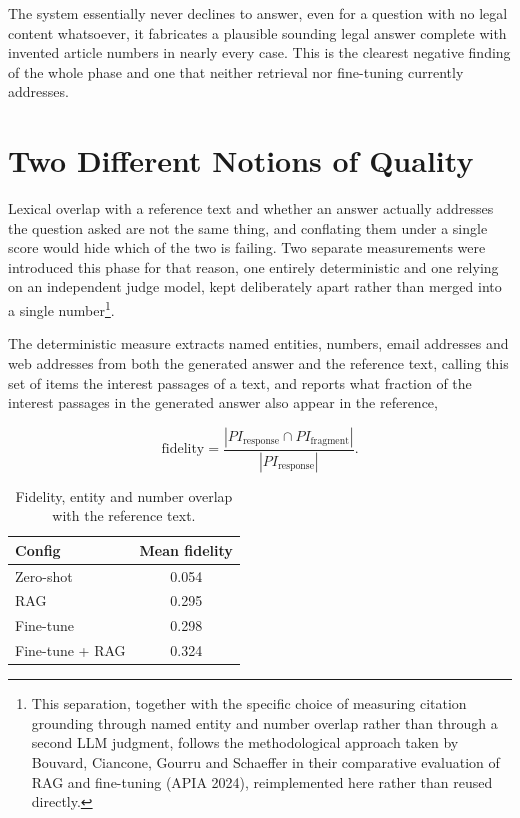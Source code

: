 \documentclass[11pt, a4paper]{article}
\begin{document}
The system essentially never declines to answer, even for a question with no legal content whatsoever, it fabricates a plausible sounding legal answer complete with invented article numbers in nearly every case. This is the clearest negative finding of the whole phase and one that neither retrieval nor fine-tuning currently addresses.

\section{Two Different Notions of Quality}
\label{sec:judge}

Lexical overlap with a reference text and whether an answer actually addresses the question asked are not the same thing, and conflating them under a single score would hide which of the two is failing. Two separate measurements were introduced this phase for that reason, one entirely deterministic and one relying on an independent judge model, kept deliberately apart rather than merged into a single number\footnote{This separation, together with the specific choice of measuring citation grounding through named entity and number overlap rather than through a second LLM judgment, follows the methodological approach taken by Bouvard, Ciancone, Gourru and Schaeffer in their comparative evaluation of RAG and fine-tuning (APIA 2024), reimplemented here rather than reused directly.}.

The deterministic measure extracts named entities, numbers, email addresses and web addresses from both the generated answer and the reference text, calling this set of items the interest passages of a text, and reports what fraction of the interest passages in the generated answer also appear in the reference,

\begin{equation}
\text{fidelity} = \frac{|PI_{\text{response}} \cap PI_{\text{fragment}}|}{|PI_{\text{response}}|}.
\end{equation}

\begin{table}[H]
\centering
\small
\begin{tabular}{lc}
\toprule
\textbf{Config} & \textbf{Mean fidelity} \\
\midrule
Zero-shot & 0.054 \\
RAG & 0.295 \\
Fine-tune & 0.298 \\
Fine-tune + RAG & 0.324 \\
\bottomrule
\end{tabular}
\caption{Fidelity, entity and number overlap with the reference text.}
\label{tab:fidelity}
\end{table}
\end{document}
